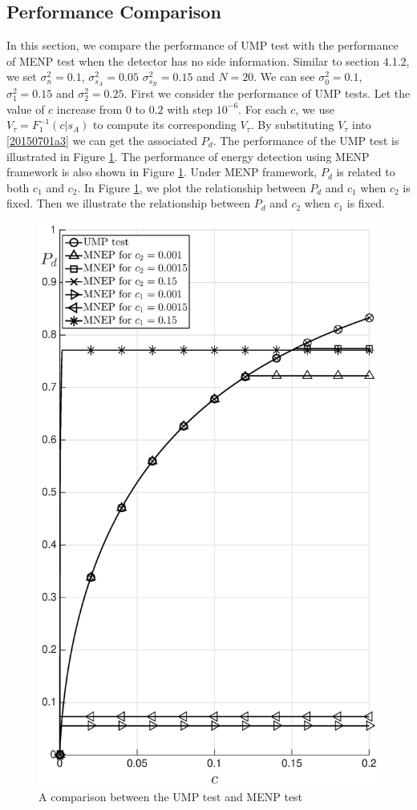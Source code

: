 \subsection{Performance Comparison}
In this section, we compare the performance of UMP test with the performance of MENP test when the detector has no side information.
Similar to section 4.1.2, we set $\sigma_n^2= 0.1$, $\sigma_{s_A}^2 = 0.05$ $\sigma_{s_B}^2 = 0.15$ and $N=20$. We can see $\sigma_0^2 = 0.1$, $\sigma_1^2=0.15$ and $\sigma_2^2 = 0.25$. 
First we consider the performance of UMP tests. 
Let the value of $c$ increase from $0$ to $0.2$ with step $10^{-6}$. For each $c$, we use $V_\tau = F_1^{-1}(c|s_A)$ to compute its corresponding $V_\tau$. By substituting $V_\tau$ into \eqref{20150701a3} we can get the associated $P_d$. The performance of the UMP test is illustrated in Figure \ref{pic:20150701a0}. 
The performance of energy detection using MENP framework is also shown in Figure \ref{pic:20150701a0}. Under MENP framework, $P_d$ is related to both $c_1$ and $c_2$. In Figure \ref{pic:20150701a0}, we plot the relationship between $P_d$ and $c_1$ when $c_2$ is fixed. Then we illustrate the relationship between $P_d$ and $c_2$ when $c_1$ is fixed.   

\begin{figure}[!hbp]
\centering
\includegraphics[width = 12cm]{5/noSI.eps}
\caption{A comparison between the UMP test and MENP test}
\label{pic:20150701a0}
\end{figure}

